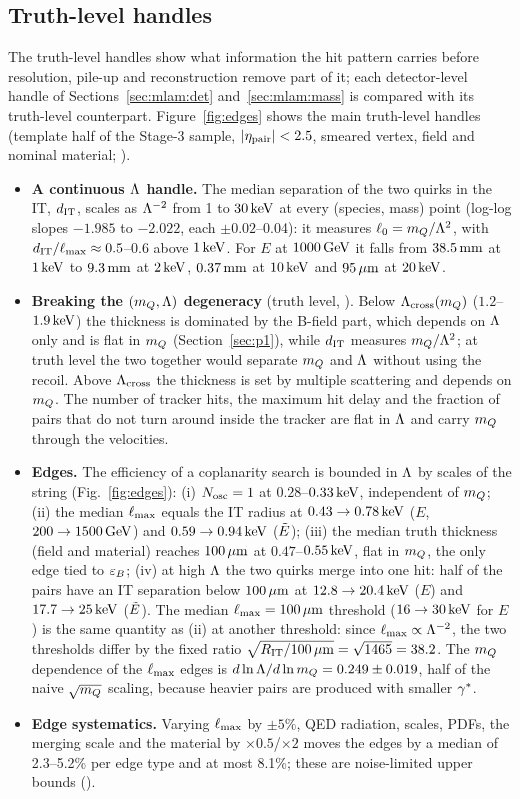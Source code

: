 \subsection{Truth-level handles}\label{sec:mlam:truth}
The truth-level handles show what information the hit pattern carries before resolution, pile-up and reconstruction
remove part of it; each detector-level handle of Sections~\ref{sec:mlam:det} and~\ref{sec:mlam:mass} is compared with
its truth-level counterpart.
Figure~\ref{fig:edges} shows the main truth-level handles (template half of the Stage-3 sample, $|\eta_{\rm pair}|<2.5$,
smeared vertex, field and nominal material; ).
\begin{itemize}
\item \textbf{A continuous $\Lambda$ handle.} The median separation of the two quirks in the IT, $d_{\rm IT}$, scales as
  $\Lambda^{-2}$ from 1 to $30\,\mathrm{keV}$ at every (species, mass) point (log-log slopes $-1.985$ to $-2.022$, each $\pm0.02$--0.04): it
  measures $\ell_0=m_Q/\Lambda^2$, with $d_{\rm IT}/\ell_{\max}\approx0.5$--0.6 above $1\,\mathrm{keV}$. For $E$ at $1000\,\mathrm{GeV}$ it falls from
  $38.5\,\mathrm{mm}$ at $1\,\mathrm{keV}$ to $9.3\,\mathrm{mm}$ at $2\,\mathrm{keV}$, $0.37\,\mathrm{mm}$ at $10\,\mathrm{keV}$ and $95\,\mu\mathrm{m}$ at $20\,\mathrm{keV}$.
\item \textbf{Breaking the $(m_Q,\Lambda)$ degeneracy} (truth level, \EST{}). Below $\Lambda_{\rm cross}(m_Q)$ ($1.2$--$1.9\,\mathrm{keV}$)
  the thickness is dominated by the B-field part, which depends on $\Lambda$ only and is flat in $m_Q$
  (Section~\ref{sec:p1}), while $d_{\rm IT}$ measures $m_Q/\Lambda^2$; at truth level the two together would separate $m_Q$
  and $\Lambda$ without using the recoil. Above $\Lambda_{\rm cross}$ the thickness is set by multiple scattering and depends on
  $m_Q$. The number of tracker hits, the maximum hit delay and the fraction of pairs that do
  not turn around inside the tracker are flat in $\Lambda$ and carry $m_Q$ through the velocities.
\item \textbf{Edges.} The efficiency of a coplanarity search is bounded in $\Lambda$ by scales of the string
  (Fig.~\ref{fig:edges}): (i) $N_{\rm osc}=1$ at $0.28$--$0.33\,\mathrm{keV}$, independent of $m_Q$; (ii) the median $\ell_{\max}$ equals the IT
  radius at $0.43\to0.78\,\mathrm{keV}$ ($E$, $200\to1500\,\mathrm{GeV}$) and $0.59\to0.94\,\mathrm{keV}$ ($\tilde{E}$); (iii) the median truth thickness
  (field and material) reaches $100\,\mu\mathrm{m}$ at $0.47$--$0.55\,\mathrm{keV}$, flat in $m_Q$, the only edge tied to $\varepsilon_B$; (iv) at high
  $\Lambda$ the two quirks merge into one hit: half of the pairs have an IT separation below $100\,\mu\mathrm{m}$ at $12.8\to20.4\,\mathrm{keV}$
  ($E$) and $17.7\to25\,\mathrm{keV}$ ($\tilde{E}$). The median $\ell_{\max}=100\,\mu\mathrm{m}$ threshold ($16\to30\,\mathrm{keV}$ for $E$) is the same quantity
  as (ii) at another threshold: since $\ell_{\max}\propto\Lambda^{-2}$, the two thresholds differ by the fixed ratio
  $\sqrt{R_{\rm IT}/100\,\mu\mathrm{m}}=\sqrt{1465}=38.2$. The $m_Q$ dependence of the $\ell_{\max}$ edges is
  $d\ln\Lambda/d\ln m_Q=0.249\pm0.019$, half of the naive $\sqrt{m_Q}$ scaling, because heavier pairs are produced with
  smaller $\gamma^*$.
\item \textbf{Edge systematics.} Varying $\ell_{\max}$ by $\pm5\%$, QED radiation, scales, PDFs, the merging scale and the
  material by $\times0.5$/$\times2$ moves the edges by a median of 2.3--5.2\% per edge type and at most 8.1\%; these are
  noise-limited upper bounds (\EST{}).
\end{itemize}

